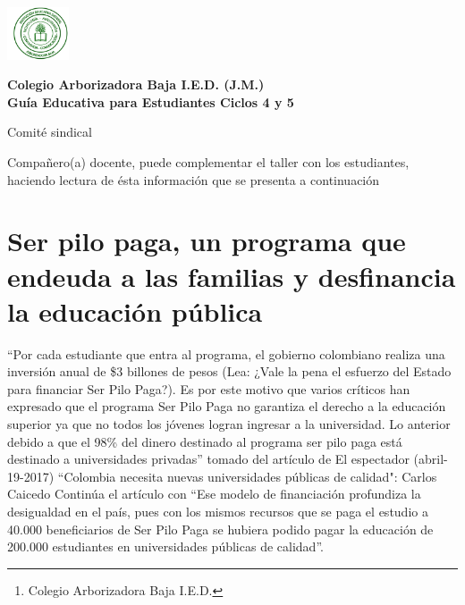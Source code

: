 \documentclass[10pt,twoside]{article}
\author{Comité sindical\thanks{Colegio Arborizadora Baja I.E.D.}}
\date{}
\begin{document}
\begin{minipage}{.2\textwidth}
\includegraphics[height=1.55cm]{Images/logo-colegio.png}\end{minipage}
\begin{minipage}{.75\textwidth}
\begin{center}
\textbf{\large Colegio Arborizadora Baja I.E.D. (J.M.)}\\
\textbf{\large Guía Educativa para Estudiantes Ciclos 4 y 5}\\
\end{center}
\end{minipage}\hfill
\vspace*{-10pt}
\begin{center}
\large Comité sindical
\end{center}
\vspace*{-10pt}
\vspace*{20pt}
Compañero(a) docente, puede complementar el taller con los estudiantes, haciendo lectura de ésta información que se presenta a continuación
\section*{Ser pilo paga, un programa que endeuda a las familias y desfinancia la educación pública}
“Por cada estudiante que entra al programa, el gobierno colombiano realiza una inversión anual de \$3 billones de pesos (Lea: ¿Vale la pena el esfuerzo del Estado para financiar Ser Pilo Paga?). Es por este motivo que varios críticos han expresado que el programa Ser Pilo Paga no garantiza el derecho a la educación superior ya que no todos los jóvenes logran ingresar a la universidad. Lo anterior debido a que el 98\% del dinero destinado al programa ser pilo paga está destinado a universidades privadas” tomado del artículo de El espectador (abril-19-2017) “Colombia necesita nuevas universidades públicas de calidad": Carlos Caicedo
Continúa el artículo con  “Ese modelo de financiación profundiza la desigualdad en el país, pues con los mismos recursos que se paga el estudio a 40.000 beneficiarios de Ser Pilo Paga se hubiera podido pagar la educación de 200.000 estudiantes en universidades públicas de calidad”.
\end{document}
